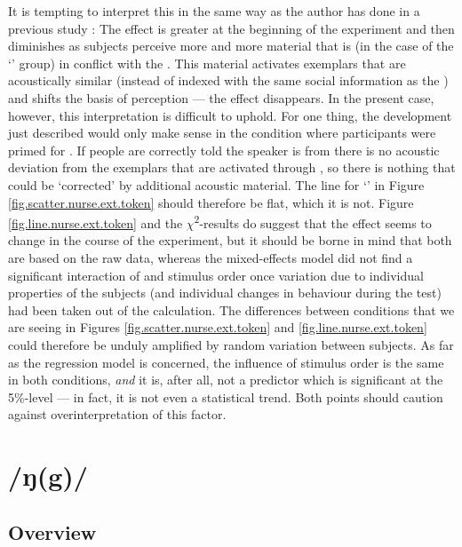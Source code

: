 It is tempting to interpret this in the same way as the author has done in a previous study \parencite[cf.][]{juskanma}: The  effect is greater at the beginning of the experiment and then diminishes as subjects perceive more and more material that is (in the case of the `' group) in conflict with the .
This material activates exemplars that are acoustically similar (instead of indexed with the same social information as the ) and shifts the basis of perception --- the  effect disappears.
In the present case, however, this interpretation is difficult to uphold.
For one thing, the development just described would only make sense in the condition where participants were primed for .
If people are correctly told the speaker is from  there is no acoustic deviation from the exemplars that are activated through , so there is nothing that could be `corrected' by additional acoustic material.
The line for `' in Figure \ref{fig.scatter.nurse.ext.token} should therefore be flat, which it is not.
Figure \ref{fig.line.nurse.ext.token} and the \(\chi\)\textsuperscript{2}-results do suggest that the  effect seems to change in the course of the experiment, but it should be borne in mind that both are based on the raw data, whereas the mixed-effects model did not find a significant interaction of  and stimulus order once variation due to individual properties of the subjects (and individual changes in behaviour during the test) had been taken out of the calculation.
The differences between conditions that we are seeing in Figures \ref{fig.scatter.nurse.ext.token} and \ref{fig.line.nurse.ext.token} could therefore be unduly amplified by random variation between subjects.
As far as the regression model is concerned, the influence of stimulus order is the same in both conditions, \emph{and} it is, after all, not a predictor which is significant at the 5\%-level --- in fact, it is not even a statistical trend.
Both points should caution against overinterpretation of this factor.


\section{/ŋ(g)/}
\label{sec.perc_res.ng}
	\subsection{Overview}
	\label{sec.perc_res.ng.overview}

